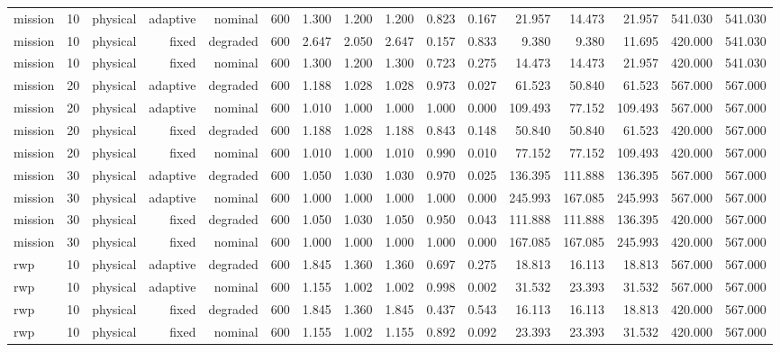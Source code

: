 \begin{tabular}{lrrrrrrrrrrrrrrr}
mission & 10 & physical & adaptive & nominal & 600 & 1.300 & 1.200 & 1.200 & 0.823 & 0.167 & 21.957 & 14.473 & 21.957 & 541.030 & 541.030 \\
mission & 10 & physical & fixed & degraded & 600 & 2.647 & 2.050 & 2.647 & 0.157 & 0.833 & 9.380 & 9.380 & 11.695 & 420.000 & 541.030 \\
mission & 10 & physical & fixed & nominal & 600 & 1.300 & 1.200 & 1.300 & 0.723 & 0.275 & 14.473 & 14.473 & 21.957 & 420.000 & 541.030 \\
mission & 20 & physical & adaptive & degraded & 600 & 1.188 & 1.028 & 1.028 & 0.973 & 0.027 & 61.523 & 50.840 & 61.523 & 567.000 & 567.000 \\
mission & 20 & physical & adaptive & nominal & 600 & 1.010 & 1.000 & 1.000 & 1.000 & 0.000 & 109.493 & 77.152 & 109.493 & 567.000 & 567.000 \\
mission & 20 & physical & fixed & degraded & 600 & 1.188 & 1.028 & 1.188 & 0.843 & 0.148 & 50.840 & 50.840 & 61.523 & 420.000 & 567.000 \\
mission & 20 & physical & fixed & nominal & 600 & 1.010 & 1.000 & 1.010 & 0.990 & 0.010 & 77.152 & 77.152 & 109.493 & 420.000 & 567.000 \\
mission & 30 & physical & adaptive & degraded & 600 & 1.050 & 1.030 & 1.030 & 0.970 & 0.025 & 136.395 & 111.888 & 136.395 & 567.000 & 567.000 \\
mission & 30 & physical & adaptive & nominal & 600 & 1.000 & 1.000 & 1.000 & 1.000 & 0.000 & 245.993 & 167.085 & 245.993 & 567.000 & 567.000 \\
mission & 30 & physical & fixed & degraded & 600 & 1.050 & 1.030 & 1.050 & 0.950 & 0.043 & 111.888 & 111.888 & 136.395 & 420.000 & 567.000 \\
mission & 30 & physical & fixed & nominal & 600 & 1.000 & 1.000 & 1.000 & 1.000 & 0.000 & 167.085 & 167.085 & 245.993 & 420.000 & 567.000 \\
rwp & 10 & physical & adaptive & degraded & 600 & 1.845 & 1.360 & 1.360 & 0.697 & 0.275 & 18.813 & 16.113 & 18.813 & 567.000 & 567.000 \\
rwp & 10 & physical & adaptive & nominal & 600 & 1.155 & 1.002 & 1.002 & 0.998 & 0.002 & 31.532 & 23.393 & 31.532 & 567.000 & 567.000 \\
rwp & 10 & physical & fixed & degraded & 600 & 1.845 & 1.360 & 1.845 & 0.437 & 0.543 & 16.113 & 16.113 & 18.813 & 420.000 & 567.000 \\
rwp & 10 & physical & fixed & nominal & 600 & 1.155 & 1.002 & 1.155 & 0.892 & 0.092 & 23.393 & 23.393 & 31.532 & 420.000 & 567.000 \\

\end{tabular}
